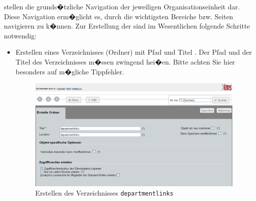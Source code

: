  stellen die grunds�tzliche Navigation
der jeweiligen Organisationseinheit dar. Diese Navigation erm�glicht
es, durch die wichtigsten Bereiche bzw. Seiten navigieren zu k�nnen.
Zur Erstellung der  sind im Wesentlichen
folgende Schritte notwendig:

\begin{itemize}
\item {Erstellen eines Verzeichnisses (Ordner) mit Pfad und Titel . Der Pfad und der Titel des Verzeichnisses m�ssen zwingend  hei�en. Bitte achten Sie hier besonders auf m�gliche Tippfehler.}

\begin{figure}[!ht]
  \centering
  \includegraphics[width=\textwidth]{./images/create-departmentlinksfolder.png}
  \caption{Erstellen des Verzeichnisses \texttt{departmentlinks}}
  \label{fig:createdeplinkfolder}
\end{figure}
	

\end{itemize}
